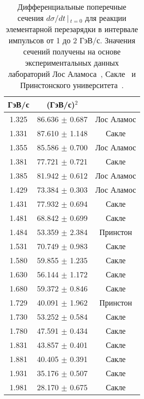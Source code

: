 \begin{table}[hp]
\begin{center}
{\begin{tabular}{|c|c|c|}
        ГэВ/с & (ГэВ/с)$^2$ & \\ \hline \hline
        1.325 & 86.636 $\pm$ 0.687 & Лос Аламос \\ \hline
        1.331 & 87.610 $\pm$ 1.148 & Сакле \\ \hline
        1.355 & 85.586 $\pm$ 0.700 & Лос Аламос \\ \hline
        1.381 & 77.721 $\pm$ 0.721 & Сакле \\ \hline
        1.385 & 81.942 $\pm$ 0.612 & Лос Аламос \\ \hline
        1.429 & 73.384 $\pm$ 0.303 & Лос Аламос \\ \hline
        1.431 & 77.932 $\pm$ 0.694 & Сакле \\ \hline
        1.481 & 68.842 $\pm$ 0.699 & Сакле \\ \hline
        1.484 & 53.359 $\pm$ 2.384 & Принстон \\ \hline
        1.531 & 70.749 $\pm$ 0.983 & Сакле \\ \hline
        1.580 & 59.855 $\pm$ 1.235 & Сакле \\ \hline
        1.630 & 56.144 $\pm$ 1.172 & Сакле \\ \hline
        1.680 & 59.372 $\pm$ 0.846 & Сакле \\ \hline
        1.729 & 40.091 $\pm$ 1.962 & Принстон \\ \hline
        1.730 & 53.252 $\pm$ 0.584 & Сакле \\ \hline
        1.780 & 47.591 $\pm$ 0.434 & Сакле \\ \hline
        1.831 & 43.857 $\pm$ 0.401 & Сакле \\ \hline
        1.881 & 40.405 $\pm$ 0.391 & Сакле \\ \hline
        1.931 & 35.176 $\pm$ 0.507 & Сакле \\ \hline
        1.981 & 28.170 $\pm$ 0.675 & Сакле \\ \hline
      \end{tabular}
    }
    \bigskip
    \caption{Дифференциальные поперечные сечения $d\sigma/dt\,|\,_{t=0}$ для
      реакции элементарной перезарядки \np в интервале импульсов от 1 до 2
      ГэВ/с. Значения сечений получены на основе экспериментальных данных
      лабораторий Лос Аламоса~\cite{bon78}, Сакле~\cite{biz75} и Принстонского
      университета~\cite{shep74}.}
    \label{tab:np_data}
  \end{center}
\end{table}



